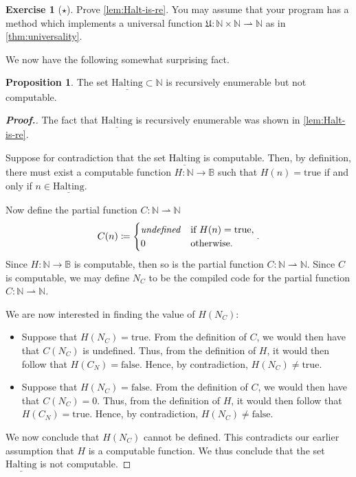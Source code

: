 \documentclass[11pt,a4paper,reqno]{amsart}
\theoremstyle{plain}
\theoremstyle{definition}
\newtheorem{proposition}[theorem]{Proposition}
\theoremstyle{definition}
\newtheorem{exercise}[theorem]{Exercise}
\newenvironment{myproof}{\begin{proof}[\normalfont\bfseries Proof.]}{\end{proof}}
\newcommand\exerciseLevelEasy{$\star$}
\begin{document}
\begin{exercise}[\exerciseLevelEasy]
  Prove \cref{lem:Halt-is-re}.
  You may assume that your program has a method which implements a universal function $\mathfrak U\colon \mathbb N\times \mathbb N \rightharpoonup \mathbb N$ as in \cref{thm:universality}.
\end{exercise}

We now have the following somewhat surprising fact.

\begin{proposition}\label{prop:re-but-not-comp}
  The set $\underline{\mathrm{Halting}}\subset \mathbb N$ is recursively enumerable but not computable.
\end{proposition}

\begin{myproof}
  The fact that $\underline{\mathrm{Halting}}$ is recursively enumerable was shown in \cref{lem:Halt-is-re}.

  Suppose for contradiction that the set $\underline{\mathrm{Halting}}$ is computable.
  Then, by definition, there must exist a computable function $H\colon \mathbb N \to \mathbb B$ such that $H(n) =\mathrm{true}$ if and only if $n\in \underline{\mathrm{Halting}}$.

Now define the partial function $C\colon \mathbb N \rightharpoonup \mathbb N$
\[
  C(n)
  \coloneqq
  \begin{cases}
    \text{\textit{undefined}} & \text{if }H(n) = \mathrm{true},\\
    0 &\text{otherwise}.
  \end{cases}.
\]
Since $H\colon \mathbb N \to \mathbb B$ is computable, then so is the partial function $C\colon \mathbb N\rightharpoonup \mathbb N$.
Since $C$ is computable, we may define $N_{C}$ to be the compiled code for the partial function $C\colon \mathbb N \rightharpoonup \mathbb N$.

We are now interested in finding the value of $H(N_C)$:
\begin{itemize}
\item
  Suppose that $H(N_C) = \mathrm{true}$.
  From the definition of $C$, we would then have that $C(N_C)$ is undefined.
  Thus, from the definition of $H$, it would then follow that $H(C_N) = \mathrm{false}$.
  Hence, by contradiction, $H(N_C) \neq \mathrm{true}$.

\item
  Suppose that $H(N_C) = \mathrm{false}$.
  From the definition of $C$, we would then have that $C(N_C) = 0$.
  Thus, from the definition of $H$, it would then follow that $H(C_N) = \mathrm{true}$.
  Hence, by contradiction, $H(N_C) \neq \mathrm{false}$.
\end{itemize}
We now conclude that $H(N_C)$ cannot be defined.
This contradicts our earlier assumption that $H$ is a computable function.
We thus conclude that the set $\underline{\mathrm{Halting}}$ is not computable.
\end{myproof}
\end{document}
